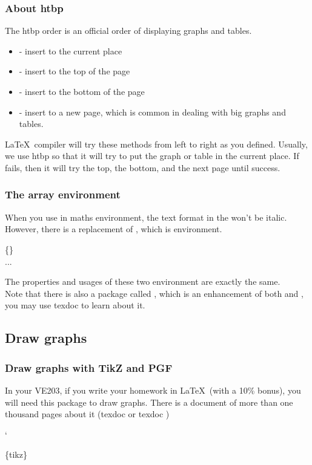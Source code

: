 \begin{frame}
	\frametitle{About htbp}
	The htbp order is an official order of displaying graphs and tables.
	\begin{itemize}
		\item {} - insert to the current place
		\item {} - insert to the top of the page
		\item {} - insert to the bottom of the page
		\item {} - insert to a new page, which is common in dealing with big graphs and tables.
	\end{itemize}
	\LaTeX\ compiler will try these methods from left to right as you defined. Usually, we use htbp so that it will try to put the graph or table in the current place. If fails, then it will try the top, the bottom, and the next page until success.
\end{frame}

\begin{frame}
	\frametitle{The array environment}
	When you use  in maths environment, the text format in the  won't be italic. However, there is a replacement of , which is  environment.
	\begin{command}
		\{\}\\
		\qquad ...\\
	\end{command}
	The properties and usages of these two environment are exactly the same. \\[0.5em]
	Note that there is also a package called , which is an enhancement of both  and , you may use \alert{texdoc}  to learn about it.
	
\end{frame}

\subsection{Draw graphs}

\begin{frame}
	\frametitle{Draw graphs with TikZ and PGF}
	In your VE203, if you write your homework in \LaTeX\ (with a 10\% bonus), you will need this package to draw graphs. There is a document of more than one thousand pages about it (\alert{texdoc}  or \alert{texdoc} )\\
	\begin{minipage}{0.45\linewidth}
		\begin{example}
			\centering
			
		\end{example}`
	\end{minipage}
	\hfill
	\begin{minipage}{0.5\linewidth}
		\{tikz\}\\
		
	\end{minipage}
\end{frame}

